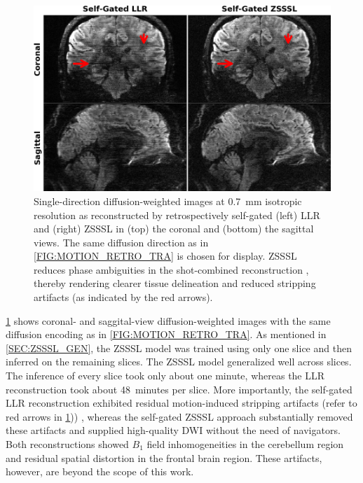 \documentclass[journal,twoside,web]{ieeecolor}
\begin{document}
	\begin{figure}
		\begin{minipage}[c]{0.75\textwidth}
			\includegraphics[width=\textwidth]{../figures/fig3.png}
		\end{minipage}\hfill
		\begin{minipage}[c]{0.23\textwidth}
			\caption{Single-direction diffusion-weighted images 
				at 0.7~mm isotropic resolution
				as reconstructed by retrospectively self-gated
				(left) LLR and (right) ZSSSL
				in (top) the coronal and (bottom) the sagittal views.
				The same diffusion direction as in \cref{FIG:MOTION_RETRO_TRA}
				is chosen for display.
				ZSSSL reduces phase ambiguities in the shot-combined reconstruction
				, thereby rendering clearer tissue delineation and
				reduced stripping artifacts (as indicated by the red arrows).}
			\label{FIG:MOTION_RETRO_2}
		\end{minipage}
	\end{figure}

	\cref{FIG:MOTION_RETRO_2} shows coronal- and saggital-view 
	diffusion-weighted images
	with the same diffusion encoding as in \cref{FIG:MOTION_RETRO_TRA}.
	As mentioned in \cref{SEC:ZSSSL_GEN}, the ZSSSL model 
	was trained using only one slice
	and then inferred on the remaining slices.
	The ZSSSL model generalized well across slices.
	The inference of every slice took only about one minute,
	whereas the LLR reconstruction took about 48~minutes per slice.
	More importantly, the self-gated LLR reconstruction exhibited residual
	motion-induced stripping artifacts 
	(refer to red arrows in \cref{FIG:MOTION_RETRO_2})) \cite{chang_2021_musium},
	whereas the self-gated ZSSSL approach substantially removed these artifacts
	and supplied high-quality DWI without the need of navigators.
	Both reconstructions showed $B_1$ field inhomogeneities in the cerebellum region 
	and residual spatial distortion in the frontal brain region. 
	These artifacts, however, are beyond the scope of this work.
	
\end{document}
